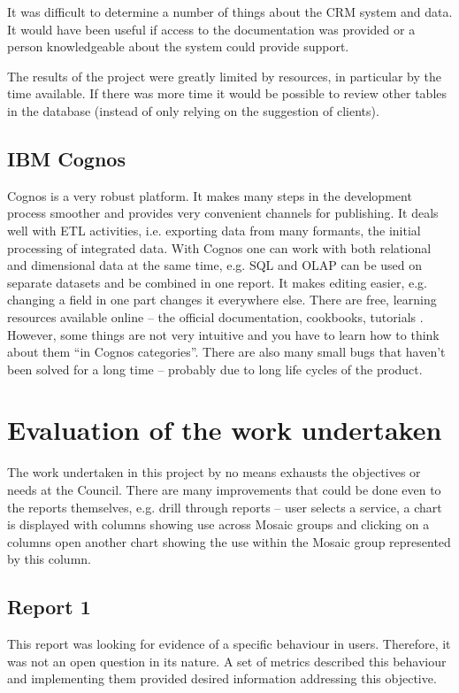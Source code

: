 It was difficult to determine a number of things about the CRM system and data. It would have been useful if access to the documentation was provided or a person knowledgeable about the system could provide support.

The results of the project were greatly limited by resources, in particular by the time available. If there was more time it would be possible to review other tables in the database (instead of only relying on the suggestion of clients).
		
		\subsection{IBM Cognos}

Cognos is a very robust platform. It makes many steps in the development process smoother and provides very convenient channels for publishing. It deals well with ETL activities, i.e. exporting data from many formants, the initial processing of integrated data. With Cognos one can work with both relational and dimensional data at the same time, e.g. SQL and OLAP can be used on separate datasets and be combined in one report. It makes editing easier, e.g. changing a field in one part changes it everywhere else. There are free, learning resources available online – the official documentation, cookbooks, tutorials \citep{MIT}. However, some things are not very intuitive and you have to learn how to think about them “in Cognos categories”. There are also many small bugs that haven’t been solved for a long time – probably due to long life cycles of the product.

	\section{Evaluation of the work undertaken}
	
The work undertaken in this project by no means exhausts the objectives or needs at the Council. There are many improvements that could be done even to the reports themselves, e.g. drill through reports – user selects a service, a chart is displayed with columns showing use across Mosaic groups and clicking on a columns open another chart showing the use within the Mosaic group represented by this column.

		\subsection{Report 1}
		
This report was looking for evidence of a specific behaviour in users. Therefore, it was not an open question in its nature. A set of metrics described this behaviour and implementing them provided desired information addressing this objective.
		
